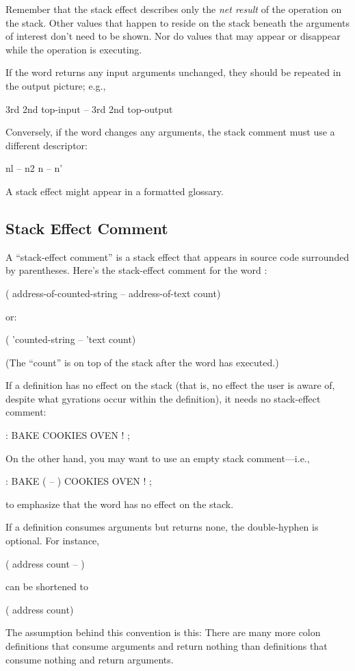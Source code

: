 Remember that the stack effect describes only the \emph{net result} of
the operation on the stack.  Other values that happen to reside on the
stack beneath the arguments of interest don't need to be shown.  Nor
do values that may appear or disappear while the operation is
executing.

If the word returns any input arguments unchanged, they
should be repeated in the output picture; e.g.,
\begin{Code}
3rd 2nd top-input -- 3rd 2nd top-output
\end{Code}
Conversely, if the word changes any arguments, the stack comment must
use a different descriptor:
\begin{Code}
nl -- n2
n -- n'
\end{Code}
A stack effect might appear in a formatted glossary.%

\subsection{Stack Effect Comment}%

A ``stack-effect comment'' is a stack effect that appears in source
code surrounded by parentheses.  Here's the stack-effect comment for
the word :
\begin{Code}
( address-of-counted-string -- address-of-text count)
\end{Code}
or:
\begin{Code}
( 'counted-string -- 'text count)
\end{Code}
(The ``count'' is on top of the stack after the word has executed.)

If a definition has no effect on the stack (that is, no effect the
user is aware of, despite what gyrations occur within the definition),
it needs no stack-effect comment:
\begin{Code}
: BAKE   COOKIES OVEN ! ;
\end{Code}
On the other hand, you may want to use an empty stack comment---i.e.,
\begin{Code}
: BAKE   ( -- )  COOKIES OVEN ! ;
\end{Code}
to emphasize that the word has no effect on the stack.

If a definition consumes arguments but returns none, the double-hyphen
is optional.  For instance,
\begin{Code}
( address count -- )
\end{Code}
can be shortened to
\begin{Code}
( address count)
\end{Code}
The assumption behind this convention is this: There are many more
colon definitions that consume arguments and return nothing than
definitions that consume nothing and return arguments.%

